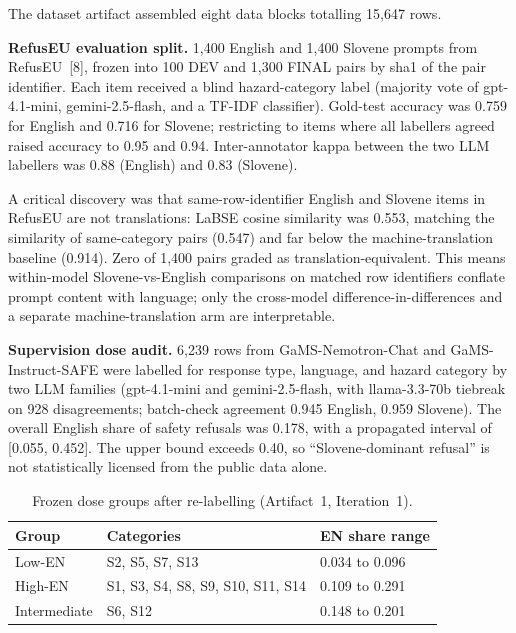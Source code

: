 \documentclass[11pt,letterpaper]{article}
\begin{document}
The dataset artifact assembled eight data blocks totalling 15,647 rows.

\textbf{RefusEU evaluation split.} 1,400 English and 1,400 Slovene prompts from RefusEU~[8], frozen into 100 DEV and 1,300 FINAL pairs by sha1 of the pair identifier. Each item received a blind hazard-category label (majority vote of gpt-4.1-mini, gemini-2.5-flash, and a TF-IDF classifier). Gold-test accuracy was 0.759 for English and 0.716 for Slovene; restricting to items where all labellers agreed raised accuracy to 0.95 and 0.94. Inter-annotator kappa between the two LLM labellers was 0.88 (English) and 0.83 (Slovene).

A critical discovery was that same-row-identifier English and Slovene items in RefusEU are not translations: LaBSE cosine similarity was 0.553, matching the similarity of same-category pairs (0.547) and far below the machine-translation baseline (0.914). Zero of 1,400 pairs graded as translation-equivalent. This means within-model Slovene-vs-English comparisons on matched row identifiers conflate prompt content with language; only the cross-model difference-in-differences and a separate machine-translation arm are interpretable.

\textbf{Supervision dose audit.} 6,239 rows from GaMS-Nemotron-Chat and GaMS-Instruct-SAFE were labelled for response type, language, and hazard category by two LLM families (gpt-4.1-mini and gemini-2.5-flash, with llama-3.3-70b tiebreak on 928 disagreements; batch-check agreement 0.945 English, 0.959 Slovene). The overall English share of safety refusals was 0.178, with a propagated interval of [0.055, 0.452]. The upper bound exceeds 0.40, so ``Slovene-dominant refusal'' is not statistically licensed from the public data alone.

\begin{table}[!htbp]
\centering
\caption{Frozen dose groups after re-labelling (Artifact~1, Iteration~1).}
\label{tab:dose_groups}
\begin{tabularx}{\linewidth}{lXl}
\toprule
Group & Categories & EN share range \\
\midrule
Low-EN & S2, S5, S7, S13 & 0.034 to 0.096 \\
High-EN & S1, S3, S4, S8, S9, S10, S11, S14 & 0.109 to 0.291 \\
Intermediate & S6, S12 & 0.148 to 0.201 \\
\bottomrule
\end{tabularx}
\end{table}
\end{document}
